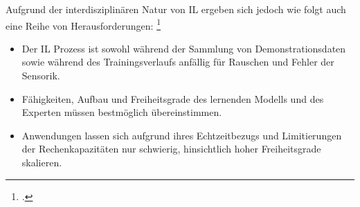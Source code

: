 Aufgrund der interdisziplinären Natur von IL ergeben sich jedoch wie folgt auch eine Reihe von Herausforderungen: \footcite[Vgl.][S. 4f.]{Hussein.2017}
\begin{itemize}
    \item Der IL Prozess ist sowohl während der Sammlung von Demonstrationsdaten sowie während des Trainingsverlaufs anfällig für Rauschen und Fehler der Sensorik.
    \item Fähigkeiten, Aufbau und Freiheitsgrade des lernenden Modells und des Experten müssen bestmöglich übereinstimmen.
    \item Anwendungen lassen sich aufgrund ihres Echtzeitbezugs und Limitierungen der Rechenkapazitäten nur schwierig, hinsichtlich hoher Freiheitsgrade skalieren.
\end{itemize}
